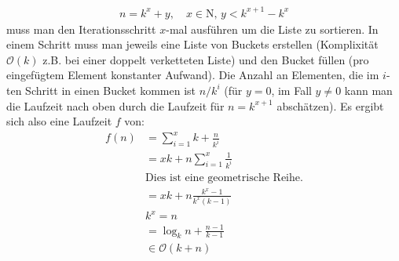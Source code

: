 \documentclass[11pt]{article}
\begin{document}
\begin{enumerate}[a)]
      \begin{align*}
        n = k^x + y, \quad x \in \mathrm{N}, \, y < k^{x + 1} - k^x
      \end{align*}
      muss man den Iterationsschritt $x$-mal ausführen um die Liste zu
      sortieren. In einem Schritt muss man jeweils eine Liste von Buckets
      erstellen (Komplixität $\mathcal{O}(k)$ z.B. bei einer doppelt verketteten
      Liste) und den Bucket füllen (pro eingefügtem Element konstanter Aufwand).
      Die Anzahl an Elementen, die im $i$-ten Schritt in einen Bucket kommen ist
      $n/k^i$ (für $y = 0$, im Fall $y \neq 0$ kann man die Laufzeit nach oben
      durch die Laufzeit für $n = k^{x + 1}$ abschätzen). Es ergibt sich also
      eine Laufzeit $f$ von:
      \begin{align*}
        f(n) &= \sum_{i = 1}^x k + \frac{n}{k^i} \\
        &= x k + n \sum_{i = 1}^x \frac{1}{k^i} \\
        &\text{Dies ist eine geometrische Reihe.} \\
        &= x k + n \frac{k^x - 1}{k^x (k - 1)} \\
        &k^x = n \\
        &= \log_k n + \frac{n - 1}{k - 1} \\
        &\in \mathcal{O}(k + n)
      \end{align*}
  \end{enumerate}
\end{document}
